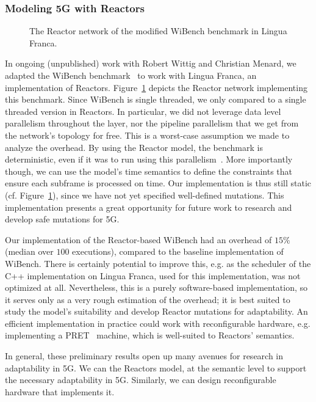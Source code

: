 \subsubsection{Modeling 5G with Reactors}

\begin{figure}[t]
	\centering
	\resizebox{1\textwidth}{!}{}
	\caption{The Reactor network of the modified WiBench benchmark in Lingua Franca.}
	\label{fig:reactors_wibench}
\end{figure}


In ongoing (unpublished) work with Robert Wittig and Christian Menard, we adapted the WiBench benchmark~\cite{wibench} to work with Lingua Franca, an implementation of Reactors. 
Figure~\ref{fig:reactors_wibench} depicts the Reactor network implementing this benchmark. 
Since WiBench is single threaded, we only compared to a single threaded version in Reactors.
In particular, we did not leverage data level parallelism throughout the layer, nor the pipeline parallelism that we get from the network's topology for free.
This is a worst-case assumption we made to analyze the overhead.
By using the Reactor model, the benchmark is deterministic, even if it was to run using this parallelism~\cite{lohstroh_cyphy19}.
More importantly though, we can use the model's time semantics to define the constraints that ensure each subframe is processed on time.
Our implementation is thus still static (cf. Figure~\ref{fig:reactors_wibench}), since we have not yet specified well-defined mutations.
This implementation presents a great opportunity for future work to research and develop safe mutations for 5G.

Our implementation of the Reactor-based WiBench had an overhead of $15\%$ (median over $100$ executions), compared to the baseline implementation of WiBench.
There is certainly potential to improve this, e.g. as the scheduler of the C++ implementation on Lingua Franca, used for this implementation, was not optimized at all.
Nevertheless, this is a purely software-based implementation, so it serves only as a very rough estimation of the overhead; it is best suited to study the model's suitability and develop Reactor mutations for adaptability.
An efficient implementation in practice could work with reconfigurable hardware, e.g. implementing a \ac{PRET}~\cite{pret} machine, which is well-suited to Reactors' semantics.

In general, these preliminary results open up many avenues for research in adaptability in 5G. We can the Reactors model, at the semantic level to support the necessary adaptability in 5G. Similarly, we can design reconfigurable hardware that implements it.

